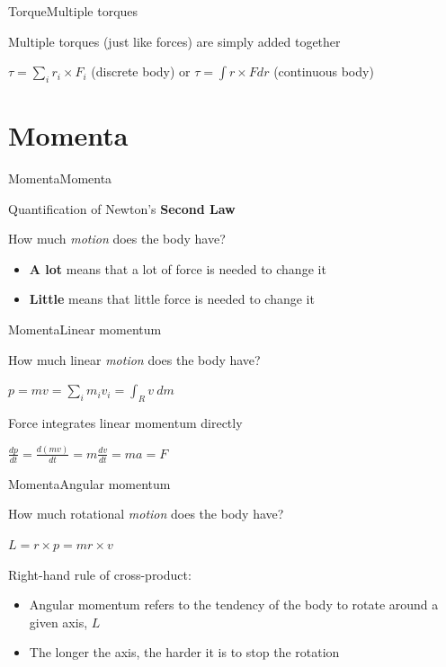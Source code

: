 \documentclass{beamer}
\begin{document}
\begin{slide}{Torque}{Multiple torques}{
\item Multiple torques (just like forces) are simply added together
\item $\tau = \sum_i r_i \times F_i$ (discrete body) or $\tau = \int r \times F dr$ (continuous body)
}\end{slide}

\section{Momenta}
\begin{slide}{Momenta}{Momenta}{
\item Quantification of Newton's \textbf{Second Law}
\item How much \textit{motion} does the body have?
\begin{itemize}
\item \textbf{A lot} means that a lot of force is needed to change it
\item \textbf{Little} means that little force is needed to change it
\end{itemize}
}\end{slide}

\begin{slide}{Momenta}{Linear momentum}{
\item How much linear \textit{motion} does the body have?
\item $p=mv=\sum_i m_i v_i=\int_R v\ dm$
\item Force integrates linear momentum directly
\item $\frac{dp}{dt} = \frac{d(mv)}{dt} = m \frac{dv}{dt} = ma = F$
}\end{slide}

\begin{slide}{Momenta}{Angular momentum}{
\item How much rotational \textit{motion} does the body have?
\item $L=r \times p=m r \times v$
\item Right-hand rule of cross-product:
\begin{itemize}
\item Angular momentum refers to the tendency of the body to rotate around a given axis, $L$
\item The longer the axis, the harder it is to stop the rotation
\end{itemize}
}\end{slide}
\end{document}

